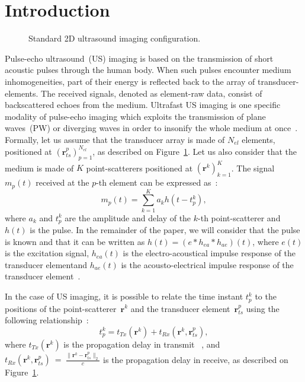 \documentclass[journal]{IEEEtran}
\newcommand{\vect}[1]{\bm{#1}}
\newcommand{\ser}[2]{#1^{#2}}
\theoremstyle{definition}
\begin{document}
\section{Introduction}
\label{sec_intro}
\begin{figure}[htb]
	\centering
	
	\caption{Standard 2D ultrasound imaging configuration.}
	\label{fig_pulse_echo}
\end{figure}
Pulse-echo ultrasound~(US) imaging is based on the transmission of short acoustic pulses through the human body. When such pulses encounter medium inhomogeneities, part of their energy is reflected back to the array of transducer-elements. The received signals, denoted as element-raw data, consist of backscattered echoes from the medium. Ultrafast US imaging is one specific modality of pulse-echo imaging which exploits the transmission of plane waves~(PW) or diverging waves in order to insonify the whole medium at once~\cite{Tanter_UFFC_2014}. Formally, let us assume that the transducer array is made of $N_{el}$ elements, positioned at $\left(\ser{\vect{r}_{ts}}{p}\right)_{p=1}^{N_{el}}$, as described on Figure~\ref{fig_pulse_echo}. Let us also consider that the medium is made of $K$ point-scatterers positioned at $\left(\vect{r}^k\right)_{k=1}^K$. The signal $m_{p} \left(t\right)$ received at the $p$-th element can be expressed as~\cite{Chernyakova2014, Tur_TSP_2012}:
\begin{equation}
\label{eq_raw_data_ultrafast}
m_{p} \left(t\right) = \sum \limits_{k=1}^{K} a_k h\left(t - \ser{t_p}{k}\right), 
\end{equation}
where $a_k$ and $\ser{t_p}{k}$ are the amplitude and delay of the $k$-th point-scatterer and $h\left(t\right)$ is the pulse. In the remainder of the paper, we will consider that the pulse is known and that it can be written as $h\left(t\right) = \left(e \ast h_{ea} \ast h_{ae}\right)\left(t\right)$, where $e\left(t\right)$ is the excitation signal, $h_{ea}\left(t\right)$ is the electro-acoustical impulse response of the transducer elementand $h_{ae}\left(t\right)$ is the acousto-electrical impulse response of the transducer element~\cite{Jensen_UFFC_1992}.

In the case of US imaging, it is possible to relate the time instant $\ser{t_p}{k}$ to the positions of the point-scatterer~$\ser{\vect{r}}{k}$ and the transducer element~$\ser{\vect{r}_{ts}}{p}$ using the following relationship~\cite{montaldo_uffc_2014}:
\begin{equation}
\label{eq_usdelay}
\ser{t_p}{k} = t_{Tx}\left(\vect{r}^k\right) + t_{Rx}\left(\vect{r}^k, \ser{\vect{r}_{ts}}{p}\right),
\end{equation}
where $t_{Tx}\left(\vect{r}^k\right)$ is the propagation delay in transmit ~\cite{montaldo_uffc_2014, Papadacci_UFFC_2014}, and $t_{Rx}\left(\vect{r}^k, \ser{\vect{r}_{ts}}{p}\right)~=~\frac{\|\vect{r}^k - \ser{\vect{r}_{ts}}{p}\|_2}{c}$ is the propagation delay in receive, as described on Figure~\ref{fig_pulse_echo}.
\end{document}
